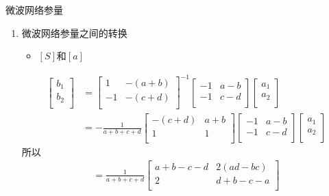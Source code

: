 \begin{frame}{微波网络参量}
    \begin{enumerate}
        \resume
        \item 微波网络参量之间的转换
        \begin{itemize}
            \item $[S]$和$[a]$
        \end{itemize}
        \begin{align*}
            \begin{bmatrix*}
                b_1 \\
                b_2 \\
            \end{bmatrix*}
            &=
            \begin{bmatrix*}
                1 & -(a+b) \\
                -1 & -(c+d) \\
            \end{bmatrix*}^{-1}
            \begin{bmatrix*}
                -1 & a-b \\
                -1 & c-d \\
            \end{bmatrix*}
            \begin{bmatrix*}
                a_1 \\
                a_2 \\
            \end{bmatrix*}\\
            &=
            -\frac{1}{a+b+c+d}
            \begin{bmatrix*}
                -(c+d) & a+b \\
                1 & 1 \\
            \end{bmatrix*}
            \begin{bmatrix*}
                -1 & a-b \\
                -1 & c-d \\
            \end{bmatrix*}
            \begin{bmatrix*}
                a_1 \\
                a_2 \\
            \end{bmatrix*}
        \end{align*}
        所以
        \begin{align*}
            [S]=\frac{1}{a+b+c+d}
            \begin{bmatrix*}
                a+b-c-d & 2(ad-bc) \\
                2 & d+b-c-a \\
            \end{bmatrix*}
        \end{align*}
        \saveenum
    \end{enumerate}
\end{frame}

